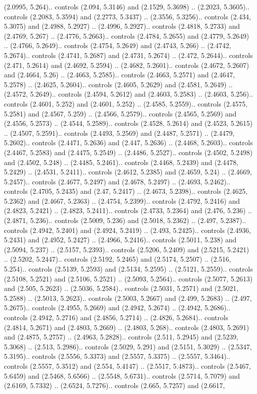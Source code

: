 (2.0995, 5.264).. controls (2.094, 5.3146) and (2.1529, 5.3698) .. (2.2023, 5.3605).. controls (2.2083, 5.3594) and (2.2773, 5.3437) .. (2.3556, 5.3256).. controls (2.434, 5.3075) and (2.4988, 5.2927) .. (2.4996, 5.2927).. controls (2.4818, 5.2733) and (2.4769, 5.267) .. (2.4776, 5.2663).. controls (2.4784, 5.2655) and (2.4779, 5.2649) .. (2.4766, 5.2649).. controls (2.4754, 5.2649) and (2.4743, 5.266) .. (2.4742, 5.2674).. controls (2.4741, 5.2687) and (2.4731, 5.2674) .. (2.472, 5.2644).. controls (2.471, 5.2614) and (2.4692, 5.2594) .. (2.4682, 5.2601).. controls (2.4672, 5.2607) and (2.4664, 5.26) .. (2.4663, 5.2585).. controls (2.4663, 5.2571) and (2.4647, 5.2578) .. (2.4625, 5.2604).. controls (2.4605, 5.2629) and (2.4581, 5.2649) .. (2.4572, 5.2649).. controls (2.4594, 5.2612) and (2.4603, 5.2583) .. (2.4603, 5.256).. controls (2.4601, 5.252) and (2.4601, 5.252) .. (2.4585, 5.2559).. controls (2.4575, 5.2581) and (2.4567, 5.259) .. (2.4566, 5.2579).. controls (2.4565, 5.2569) and (2.4556, 5.2573) .. (2.4544, 5.2589).. controls (2.4528, 5.2614) and (2.4523, 5.2615) .. (2.4507, 5.2591).. controls (2.4493, 5.2569) and (2.4487, 5.2571) .. (2.4479, 5.2602).. controls (2.4471, 5.2636) and (2.447, 5.2636) .. (2.4468, 5.2603).. controls (2.4467, 5.2583) and (2.4475, 5.2549) .. (2.4486, 5.2527).. controls (2.4502, 5.2498) and (2.4502, 5.248) .. (2.4485, 5.2461).. controls (2.4468, 5.2439) and (2.4478, 5.2429) .. (2.4531, 5.2411).. controls (2.4612, 5.2385) and (2.4659, 5.24) .. (2.4669, 5.2457).. controls (2.4677, 5.2497) and (2.4678, 5.2497) .. (2.4693, 5.2462).. controls (2.4705, 5.2435) and (2.47, 5.2417) .. (2.4673, 5.2398).. controls (2.4625, 5.2362) and (2.4667, 5.2363) .. (2.4754, 5.2399).. controls (2.4792, 5.2416) and (2.4823, 5.2421) .. (2.4823, 5.2411).. controls (2.4733, 5.2364) and (2.476, 5.236) .. (2.4871, 5.236).. controls (2.5009, 5.236) and (2.5018, 5.2362) .. (2.497, 5.2387).. controls (2.4942, 5.2401) and (2.4924, 5.2419) .. (2.493, 5.2425).. controls (2.4936, 5.2431) and (2.4952, 5.2427) .. (2.4966, 5.2416).. controls (2.5011, 5.238) and (2.5094, 5.237) .. (2.5157, 5.2393).. controls (2.5206, 5.2409) and (2.5215, 5.2421) .. (2.5202, 5.2447).. controls (2.5192, 5.2465) and (2.5174, 5.2507) .. (2.516, 5.254).. controls (2.5139, 5.2593) and (2.5134, 5.2595) .. (2.5121, 5.2559).. controls (2.5108, 5.2521) and (2.5106, 5.2521) .. (2.5093, 5.2564).. controls (2.5077, 5.2613) and (2.505, 5.2623) .. (2.5036, 5.2584).. controls (2.5031, 5.2571) and (2.5021, 5.2588) .. (2.5013, 5.2623).. controls (2.5003, 5.2667) and (2.499, 5.2683) .. (2.497, 5.2675).. controls (2.4955, 5.2669) and (2.4942, 5.2674) .. (2.4942, 5.2686).. controls (2.4942, 5.2716) and (2.4856, 5.2714) .. (2.4826, 5.2684).. controls (2.4814, 5.2671) and (2.4803, 5.2669) .. (2.4803, 5.268).. controls (2.4803, 5.2691) and (2.4875, 5.2757) .. (2.4963, 5.2828).. controls (2.511, 5.2945) and (2.5239, 5.3068) .. (2.513, 5.2986).. controls (2.5029, 5.291) and (2.5151, 5.3029) .. (2.5347, 5.3195).. controls (2.5556, 5.3373) and (2.5557, 5.3375) .. (2.5557, 5.3464).. controls (2.5557, 5.3512) and (2.554, 5.4147) .. (2.5517, 5.4873).. controls (2.5467, 5.6459) and (2.5468, 5.6566) .. (2.5548, 5.6731).. controls (2.5714, 5.7079) and (2.6169, 5.7332) .. (2.6524, 5.7276).. controls (2.665, 5.7257) and (2.6617, 